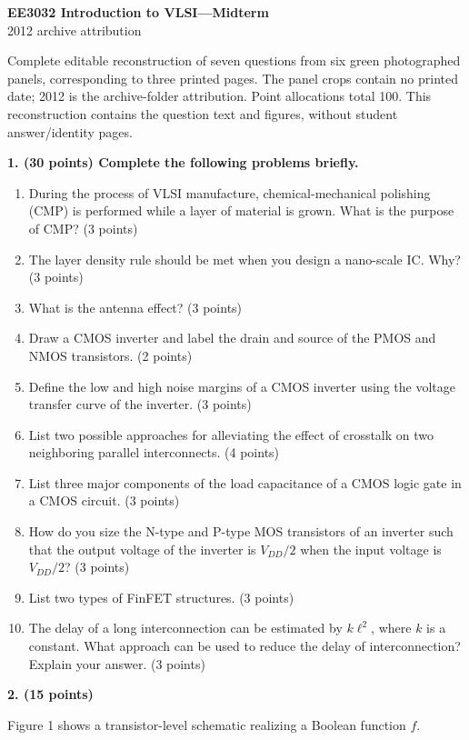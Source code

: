 \documentclass[10pt]{article}
\newcommand{\qheading}[1]{\par\medskip\textbf{#1}\par}
\begin{document}
\begin{center}{\Large\bfseries EE3032 Introduction to VLSI---Midterm}\\2012 archive attribution\end{center}
\small Complete editable reconstruction of seven questions from six green photographed panels, corresponding to three printed pages. The panel crops contain no printed date; 2012 is the archive-folder attribution. Point allocations total 100. This reconstruction contains the question text and figures, without student answer/identity pages.\normalsize
\qheading{1. (30 points) Complete the following problems briefly.}
\begin{enumerate}[label=(\alph*),leftmargin=7mm]
\item During the process of VLSI manufacture, chemical-mechanical polishing (CMP) is performed while a layer of material is grown. What is the purpose of CMP? (3 points)
\item The layer density rule should be met when you design a nano-scale IC. Why? (3 points)
\item What is the antenna effect? (3 points)
\item Draw a CMOS inverter and label the drain and source of the PMOS and NMOS transistors. (2 points)
\item Define the low and high noise margins of a CMOS inverter using the voltage transfer curve of the inverter. (3 points)
\item List two possible approaches for alleviating the effect of crosstalk on two neighboring parallel interconnects. (4 points)
\item List three major components of the load capacitance of a CMOS logic gate in a CMOS circuit. (3 points)
\item How do you size the N-type and P-type MOS transistors of an inverter such that the output voltage of the inverter is $V_{DD}/2$ when the input voltage is $V_{DD}/2$? (3 points)
\item List two types of FinFET structures. (3 points)
\item The delay of a long interconnection can be estimated by $k\ell^2$, where $k$ is a constant. What approach can be used to reduce the delay of interconnection? Explain your answer. (3 points)
\end{enumerate}
\qheading{2. (15 points)} Figure 1 shows a transistor-level schematic realizing a Boolean function $f$.
\end{document}
